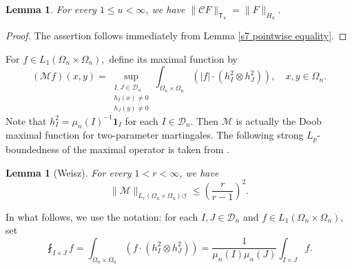 \documentclass{amsart}
\numberwithin{equation}{section}
\newtheorem{lem}[thm]{Lemma}
\theoremstyle{definition}
\theoremstyle{remark}
\newcommand{\1}{\mathbf 1}
\newcommand{\T}{\mathsf T}
\begin{document}
\begin{lem}\label{hardy space vs tent space}
For every $1\leq u<\infty$, we have $\|\mathcal{C}F\|_{\T_u}=\|F\|_{H_u}.$
\end{lem}
\begin{proof} The assertion follows immediately from Lemma \ref{s7 pointwise equality}.
\end{proof}


For $f\in L_1(\Omega_n\times\Omega_n),$ define its maximal function by
$$(\mathcal{M}f)(x,y)=\sup_{\substack{I,J\in\mathcal{D}_n\\ h_I(x)\neq0\\ h_J(y)\neq 0}}\int_{\Omega_n\times\Omega_n}(|f|\cdot (h_I^2\otimes h_J^2)),\quad x,y\in\Omega_n.$$
Note that $h_I^2=\mu_n(I)^{-1}\1_I$ for each $I\in\mathcal{D}_n$. Then $\mathcal{M}$ is actually the Doob maximal function for two-parameter martingales.
The following strong $L_p$-boundedness of the maximal operator is taken from \cite[Proposition 3.4]{We1994}.

\begin{lem}[Weisz]\label{maximal function norm estimate}
For every $1<r<\infty$, we have
$$\|\mathcal{M}\|_{L_r(\Omega_n\times\Omega_n)\circlearrowleft}\leq \left(\frac{r}{r-1}\right)^2.$$
\end{lem}



In what follows, we use the notation: for each $ I,J\in\mathcal{D}_n$ and  $f\in L_1(\Omega_n\times\Omega_n)$, set
$$\fint_{I\times J}f=\int_{\Omega_n\times\Omega_n}(f\cdot (h_I^2\otimes h_J^2))=\frac{1}{\mu_n(I)\mu_n(J)}\int_{I\times J} f.$$
\end{document}
